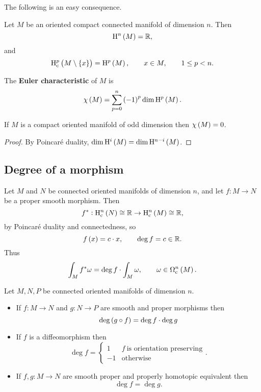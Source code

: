 The following is an easy consequence.

\begin{corollary}
Let $ M $ be an oriented compact connected manifold of dimension $ n $. Then
$$ \H^n\br{M} = \RR, $$
and
$$ \H_\c^p\br{M \setminus \cbr{x}} = \H^p\br{M}, \qquad x \in M, \qquad 1 \le p < n. $$
\end{corollary}

\begin{definition}
The \textbf{Euler characteristic} of $ M $ is
$$ \chi\br{M} = \sum_{p = 0}^n \br{-1}^p \dim \H^p\br{M}. $$
\end{definition}

\begin{corollary}
If $ M $ is a compact oriented manifold of odd dimension then $ \chi\br{M} = 0 $.
\end{corollary}

\begin{proof}
By Poincar\'e duality, $ \dim \H^i\br{M} = \dim \H^{n - i}\br{M} $.
\end{proof}

\pagebreak

\subsection{Degree of a morphism}

Let $ M $ and $ N $ be connected oriented manifolds of dimension $ n $, and let $ f : M \to N $ be a proper smooth morphism. Then
$$ f^* : \H_\c^n\br{N} \cong \RR \to \H_\c^n\br{M} \cong \RR, $$
by Poincar\'e duality and connectedness, so
$$ f\br{x} = c \cdot x, \qquad \deg f = c \in \RR. $$
Thus
$$ \int_M f^*\omega = \deg f \cdot \int_M \omega, \qquad \omega \in \Omega_\c^n\br{M}. $$


\begin{proposition}
Let $ M, N, P $ be connected oriented manifolds of dimension $ n $.
\begin{itemize}
\item If $ f : M \to N $ and $ g : N \to P $ are smooth and proper morphisms then
$$ \deg \br{g \circ f} = \deg f \cdot \deg g $$
\item If $ f $ is a diffeomorphism then
$$ \deg f =
\begin{cases}
1 & f \ \text{is orientation preserving} \\
-1 & \text{otherwise}
\end{cases}.
$$
\item If $ f, g : M \to N $ are smooth proper and properly homotopic equivalent then
$$ \deg f = \deg g. $$
\end{itemize}
\end{proposition}

